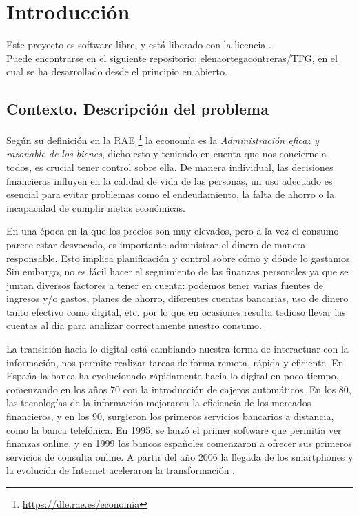 \chapter{Introducción}
Este proyecto es software libre, y está liberado con la licencia \cite{gplv3}.\\

Puede encontrarse en el siguiente repositorio:
\href{https://github.com/elenaortegacontreras/TFG}{elenaortegacontreras/TFG}, 
en el cual se ha desarrollado desde el principio en abierto.

\section{Contexto. Descripción del problema}

Según su definición en la RAE \footnote{\url{https://dle.rae.es/economía}} la economía es la 
\textit{Administración eficaz y razonable de los bienes}, dicho esto y teniendo en 
cuenta que nos concierne a todos, es crucial tener control sobre ella. 
De manera individual, las decisiones financieras influyen en la calidad de vida de las personas,
un uso adecuado es esencial para evitar problemas como el endeudamiento, la 
falta de ahorro o la incapacidad de cumplir metas económicas.

En una época en la que los precios son muy elevados, pero a la vez el consumo parece estar 
desvocado, es importante administrar el dinero de manera responsable. Esto 
implica planificación y control sobre cómo y dónde lo gastamos.
Sin embargo, no es fácil hacer el seguimiento de las finanzas personales ya que se 
juntan diversos factores a tener en cuenta: podemos tener varias fuentes de ingresos y/o 
gastos, planes de ahorro, diferentes cuentas bancarias, uso de dinero tanto 
efectivo como digital, etc. por lo que en ocasiones resulta tedioso 
llevar las cuentas al día para analizar correctamente nuestro consumo.

La transición hacia lo digital está cambiando nuestra forma de interactuar con 
la información, nos permite realizar tareas de forma remota, rápida y eficiente. 
En España la banca ha evolucionado rápidamente hacia lo digital en poco tiempo, comenzando en los años 70 con la introducción de cajeros automáticos. En los 80, las tecnologías de la información mejoraron la eficiencia de los mercados financieros, y en los 90, surgieron los primeros servicios bancarios a distancia, como la banca telefónica. En 1995, se lanzó el primer software que permitía ver finanzas online, y en 1999 los bancos españoles comenzaron a ofrecer  sus primeros servicios de consulta online. A partir del año 2006 la llegada de los smartphones y la evolución de Internet aceleraron la transformación \cite{hebrero2022fintech}.

